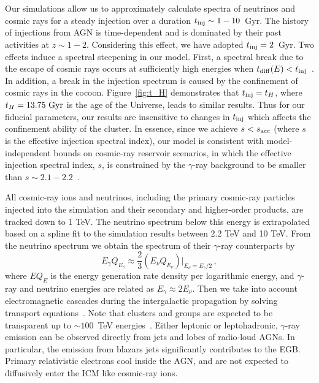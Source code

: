 \documentclass[aps,prd,onecolumn,superscriptaddress,11pt]{revtex4}
\begin{document}
Our simulations allow us to approximately calculate spectra of neutrinos and cosmic rays for a steady injection over a duration $t_{\rm inj}\sim1-10$~Gyr. The history of injections from AGN is time-dependent and is dominated by their past activities at $z\sim1-2$. Considering this effect, we have adopted $t_{\rm inj}=2$~Gyr. 
Two effects induce a spectral steepening in our model. First, a spectral break due to the escape of cosmic rays occurs at sufficiently high energies when $t_{\rm diff}(E)<t_{\rm inj}$~\cite{Murase:2008yt,Murase:2013rfa}. In addition, a break in the injection spectrum is caused by the confinement of cosmic rays in the cocoon. Figure~\ref{fig:t_H} demonstrates that $t_{\rm inj}=t_H$, where $t_H=13.75~{\rm Gyr}$ is the age of the Universe, leads to similar results. Thus for our fiducial parameters, our results are insensitive to changes in $t_{\rm inj}$ which affects the confinement ability of the cluster.
In essence, since we achieve $s<s_{\rm acc}$ (where $s$ is the effective injection spectral index), our model is consistent with model-independent bounds on cosmic-ray reservoir scenarios, in which the effective injection spectral index, $s$, is constrained by the $\gamma$-ray background to be smaller than $s\sim2.1-2.2$~\cite{Murase:2013rfa}. 

All cosmic-ray ions and neutrinos, including the primary cosmic-ray particles injected into the simulation and their secondary and higher-order products, are tracked down to 1 TeV. The neutrino spectrum below this energy is extrapolated based on a spline fit to the simulation results between 2.2 TeV and 10 TeV. From the neutrino spectrum we obtain the spectrum of their $\gamma$-ray counterparts by~\cite{Murase:2015xka}
\begin{equation}\label{eq:Qgamma}
E_{\gamma}Q_{E_\gamma}\approx\frac{2}{3}(E_{\nu}Q_{E_\nu})\big|_{E_\nu=E_\gamma/2}\,,
\end{equation}
where $E Q_{E}$ is the energy generation rate density per logarithmic energy, and $\gamma$-ray and neutrino energies are related as $E_\gamma\approx2E_\nu$. Then we take into account electromagnetic cascades during the intergalactic propagation by solving transport equations~\cite{Murase:2012df}. Note that clusters and groups are expected to be transparent up to $\sim100$~TeV energies~\cite{Inoue:2005vz,Murase:2012rd}. Either leptonic or leptohadronic, $\gamma$-ray emission can be observed directly from jets and lobes of radio-loud AGNs.  In particular, the emission from blazars jets significantly contributes to the EGB. Primary relativistic electrons cool inside the AGN, and are not expected to diffusively enter the ICM like cosmic-ray ions.
\end{document}
